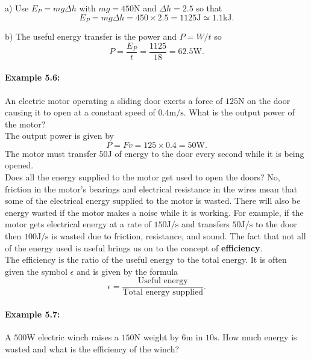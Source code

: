 a) Use $E_{P}=mg\Delta h$ with $mg =450\text{N}$ and $\Delta h= 2.5$ so that
\begin{equation*}
E_{P}=mg\Delta h=450\times 2.5 =1125\text{J}\simeq 1.1\text{kJ}.
\end{equation*}

b) The useful energy transfer is the power and $P=W/t$ so 
\begin{equation*}
P=\frac{E_{P}}{t}=\frac{1125}{18}=62.5\text{W}.
\end{equation*}

\paragraph{Example 5.6:} An electric motor operating a sliding door exerts a force of $125\text{N}$ on the door causing it to open at a constant speed of $0.4 \text{m/s}$. What is the output power of the motor?\\

The output power is given by
\begin{equation*}
P=Fv=125\times 0.4 =50\text{W}.
\end{equation*}
The motor must transfer $50\text{J}$ of energy to the door every second while it is being opened.\\

Does all the energy supplied to the motor get used to open the doors? No, friction in the motor's bearings and electrical resistance in the wires mean that some of the electrical energy supplied to the motor is wasted. There will also be energy wasted if the motor makes a noise while it is working. For example, if the motor gets electrical energy at a rate of $150\text{J/s}$ and transfers $50\text{J/s}$ to the door then $100\text{J/s}$ is wasted due to friction, resistance, and sound. The fact that not all of the energy used is useful brings us on to the concept of \textbf{efficiency}.\\

The efficiency is the ratio of the useful energy to the total energy. It is often given the symbol $\epsilon$ and is given by the formula
\begin{equation*}
\epsilon =\frac{\text{Useful energy}}{\text{Total energy supplied}}.
\end{equation*}

\paragraph{Example 5.7:}  A $500\text{W}$ electric winch raises a $150\text{N}$ weight by $6\text{m}$ in $10\text{s}$. How much energy is wasted and what is the efficiency of the winch?\\

